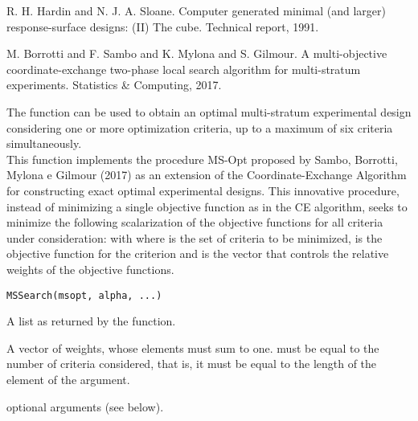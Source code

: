 \documentclass[a4paper]{book}
\begin{document}
%
\begin{References}\relax
R. H. Hardin and N. J. A. Sloane. Computer generated minimal (and larger)
response-surface designs: (II) The cube. Technical report, 1991.

M. Borrotti and F. Sambo and K. Mylona and S. Gilmour. A multi-objective
coordinate-exchange two-phase local search algorithm for multi-stratum
experiments. Statistics \& Computing, 2017.
\end{References}
%
\begin{Description}\relax
The  function can be used to obtain an optimal
multi-stratum experimental design considering one or more optimization criteria,
up to a maximum of six criteria simultaneously. \\{}
This function implements the procedure MS-Opt proposed by Sambo, Borrotti,
Mylona e Gilmour (2017) as an extension of the Coordinate-Exchange Algorithm
for constructing exact optimal experimental designs. This innovative procedure,
instead of minimizing a single objective function as in the CE algorithm,
seeks to minimize the following scalarization of the objective functions for
all criteria under consideration:
with
where  is the set of criteria to be minimized,  is the objective function
for the  criterion and \eqn{\overline{\alpha}}{} is the vector that controls
the relative weights of the objective functions.
\end{Description}
%
\begin{Usage}
\begin{verbatim}
MSSearch(msopt, alpha, ...)
\end{verbatim}
\end{Usage}
%
\begin{Arguments}
\begin{ldescription}
\item[\code{msopt}] A list as returned by the  function.

\item[\code{alpha}] A vector of weights, whose elements must sum to one.
 must be equal to the number of criteria considered, that
is, it must be equal to the length of the  element of the
 argument.

\item[\code{...}] optional arguments (see below).
\end{ldescription}
\end{Arguments}
\end{document}
